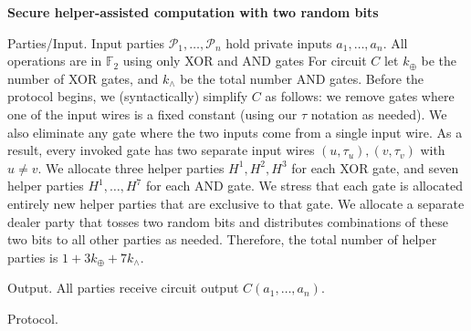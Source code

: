{\bfseries Secure helper-assisted computation with two random bits


Parties/Input.
Input parties $\mathcal{P}_{1},\ldots,\mathcal{P}_{n}$
hold private inputs $a_{1},\ldots,a_{n}$.
All operations are in $\mathbb{F}_{2}$ using only XOR and AND gates
For circuit $C$ let $k_{\oplus}$ be the number of XOR gates, and $k_{\wedge}$ be the total number AND gates. Before the protocol begins, we (syntactically) simplify $C$ as follows:
we remove gates where one of the input wires is a fixed constant (using our $\tau$ notation as needed). We also eliminate any gate where the two inputs come from a single input wire.
As a result, every invoked gate has two separate input wires
$(u,\tau_{u}),(v,\tau_{v})$ with $u\neq v$.
We allocate three helper parties $H^{1},H^{2},H^{3}$ for each XOR gate, and seven helper parties $H^{1},\ldots,H^{7}$ for each AND gate. We stress that each gate is allocated entirely new helper parties that are exclusive to that gate. We allocate a separate
dealer party that tosses two random bits and distributes combinations of these two bits to all other parties as needed. Therefore, the total number of helper parties is
$1+3k_{\oplus}+7k_{\wedge}$.}\par




Output. All parties receive circuit output $C(a_{1},\ldots,a_{n})$.\par




Protocol.\par


